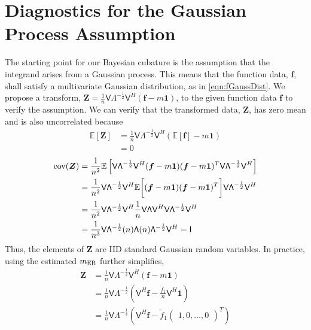 \documentclass{svjour3}                     %
\newcommand{\bm}[1]{\boldsymbol{#1}}
\newcommand{\Ex}{\mathbb{E}}
\newcommand{\vf}{\bm{f}}
\newcommand{\vZ}{\bm{Z}}
\newcommand{\vone}{\bm{1}}
\newcommand{\cov}{{\textup{cov}}}
\newcommand{\mLambda}{\mathsf{\Lambda}}
\newcommand{\mV}{\mathsf{V}}
\newcommand{\MLE}{\textup{EB}}
\begin{document}
\section{Diagnostics for the Gaussian Process Assumption}

The starting point for our Bayesian cubature is the assumption that the integrand arises from a Gaussian process. This means that the function data, $\vf$, shall satisfy a multivariate Gaussian distribution, as in \eqref{eqn:fGaussDist}. We propose a transform, $\vZ = \frac 1n \mV \mLambda^{-\frac 12} \mV^H(\vf - m \vone)$, to the given function data $\vf$ to verify the assumption.  We can verify that the transformed data, $\vZ$, has zero mean and is also uncorrelated because
\begin{align*}
\Ex\left[\vZ \right] &= 
\frac 1n \mV \mLambda^{-\frac 12} \mV^H(\Ex\left[\vf\right] - m \vone) 
\\
& = 0
\end{align*}
\begin{align*}
\cov (\vZ) 
&= \frac {1}{n^2} \Ex\left[  
\mV \mLambda^{-\frac 12} \mV^H (\vf - m \vone)
(\vf - m \vone)^T \mV \mLambda^{-\frac 12} \mV^H
\right]
\\
&=
\frac {1}{n^2} \mV \mLambda^{-\frac 12} \mV^H 
\Ex \biggl[ (\vf - m \vone)
(\vf - m \vone)^T \biggr] \mV \mLambda^{-\frac 12} \mV^H
\\ %
&=
\frac{1}{n^2} \mV \mLambda^{-\frac 12} \mV^H 
\frac 1n \mV \mLambda \mV^H \mV \mLambda^{-\frac 12} \mV^H
\\
&=
\frac{1}{n^3} \mV \mLambda^{-\frac 12} (n) \mLambda (n) \mLambda^{-\frac 12} \mV^H
= \mathsf{I}
\end{align*}
Thus, the elements of $\vZ$ are IID standard Gaussian random variables.  
In practice, using the estimated $m_\MLE$ further simplifies, 
\begin{align*}
\vZ &= \frac 1n \mV \mLambda^{-\frac 12} \mV^H(\vf - m \vone) \\
&= \frac 1n \mV \mLambda^{-\frac 12} (\mV^H \vf - \frac{\tilde{f}_1}{n} \mV^H \vone) 
\\
&= \frac 1n \mV \mLambda^{-\frac 12} \left(\mV^H \vf - \tilde{f}_1 \begin{pmatrix}1, 0, \hdots, 0 \end{pmatrix}^T \right) 
\end{align*}
\end{document}

